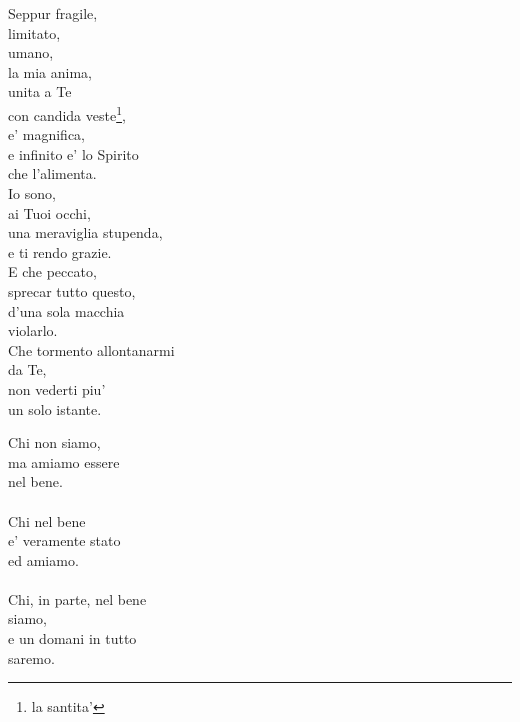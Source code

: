 \begin{haiku}
    Seppur fragile,\\
    limitato,\\
    umano,\\
    la mia anima,\\
    unita a Te\\
    con candida veste\footnote{la santita'},\\
    e' magnifica,\\
    e infinito e' lo Spirito\\
    che l'alimenta.\\
    Io sono, \\
    ai Tuoi occhi,\\
    una meraviglia stupenda,\\
    e ti rendo grazie.\\
    E che peccato,\\
    sprecar tutto questo,\\
    d'una sola macchia\\
    violarlo.\\
    Che tormento allontanarmi\\
    da Te,\\
    non vederti piu' \\
    un solo istante.\\
\end{haiku}

\begin{haiku}
    Chi non siamo,\\
    ma amiamo essere\\
    nel bene.\\
    \leavevmode\\
    Chi nel bene\\
    e' veramente stato\\
    ed amiamo.\\
    \leavevmode\\
    Chi, in parte, nel bene\\
    siamo,\\
    e un domani in tutto\\
    saremo.\\
\end{haiku}

